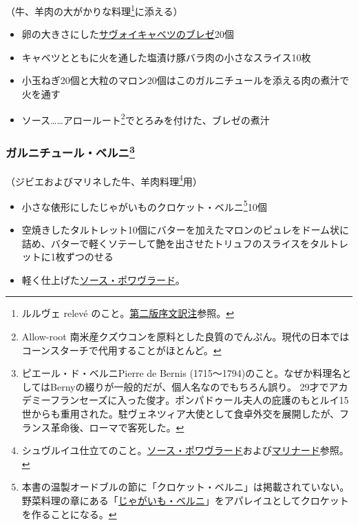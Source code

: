 \begin{recette}
（牛、羊肉の大がかりな料理\footnote{ルルヴェ relevé
  のこと。\protect\hyperlink{releve}{第二版序文訳注}参照。}に添える）

\begin{itemize}
\item
  卵の大きさにした\protect\hyperlink{chou-braise}{サヴォイキャベツのブレゼ}20個
\item
  キャベツとともに火を通した塩漬け豚バラ肉の小さなスライス10枚
\item
  小玉ねぎ20個と大粒のマロン20個はこのガルニチュールを添える肉の煮汁で火を通す
\item
  ソース\ldots{}\ldots{}アロールート\footnote{Allow-root
    南米産クズウコンを原料とした良質のでんぷん。現代の日本ではコーンスターチで代用することがほとんど。}でとろみを付けた、ブレゼの煮汁
\end{itemize}

\hypertarget{garniture-berny}{%
\subsubsection[ガルニチュール・ベルニ]{\texorpdfstring{ガルニチュール・ベルニ\footnote{ピエール・ド・ベルニPierre
  de Bernis
  (1715〜1794)のこと。なぜか料理名としてはBernyの綴りが一般的だが、個人名なのでもちろん誤り。
  29才でアカデミーフランセーズに入った俊才。ポンパドゥール夫人の庇護のもとルイ15世からも重用された。駐ヴェネツィア大使として食卓外交を展開したが、フランス革命後、ローマで客死した。}}{ガルニチュール・ベルニ}}\label{garniture-berny}}



（ジビエおよびマリネした牛、羊肉料理\footnote{シュヴルイユ仕立てのこと。\protect\hyperlink{sauce-porvrade}{ソース・ポワヴラード}および\protect\hyperlink{marinade-crue-pour-viandes-de-boucherie-ou-venaison}{マリナード}参照。}用）

\begin{itemize}
\item
  小さな俵形にしたじゃがいものクロケット・ベルニ\footnote{本書の温製オードブルの節に「クロケット・ベルニ」は掲載されていない。野菜料理の章にある「\protect\hyperlink{pommes-de-terre-berny}{じゃがいも・ベルニ}」をアパレイユとしてクロケットを作ることになる。}10個
\item
  空焼きしたタルトレット10個にバターを加えたマロンのピュレをドーム状に詰め、バターで軽くソテーして艶を出させたトリュフのスライスをタルトレットに1枚ずつのせる
\item
  軽く仕上げた\protect\hyperlink{sauce-poivrade}{ソース・ポワヴラード}。
\end{itemize}


\end{recette}
